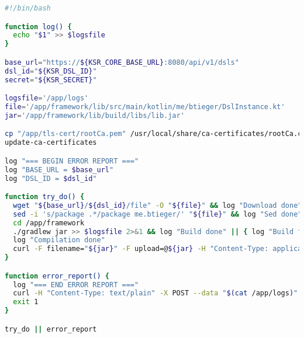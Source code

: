 \begin{lstlisting}[caption={Builder script},language=bash,label=appendix:builder]
#!/bin/bash

function log() {
  echo "$1" >> $logsfile
}

base_url="https://${KSR_CORE_BASE_URL}:8080/api/v1/dsls"
dsl_id="${KSR_DSL_ID}"
secret="${KSR_SECRET}"

logsfile='/app/logs'
file='/app/framework/lib/src/main/kotlin/me/btieger/DslInstance.kt'
jar='/app/framework/lib/build/libs/lib.jar'

cp "/app/tls-cert/rootCa.pem" /usr/local/share/ca-certificates/rootCa.crt
update-ca-certificates

log "=== BEGIN ERROR REPORT ==="
log "BASE_URL = $base_url"
log "DSL_ID = $dsl_id"

function try_do() {
  wget "${base_url}/${dsl_id}/file" -O "${file}" && log "Download done" || { log "Download failed" && error_report; }
  sed -i 's/package .*/package me.btieger/' "${file}" && log "Sed done" || { log "Sed failed" && error_report; }
  cd /app/framework
  ./gradlew jar >> $logsfile 2>&1 && log "Build done" || { log "Build failed" && error_report; }
  log "Compilation done"
  curl -F filename="${jar}" -F upload=@${jar} -H "Content-Type: application/java-archive" "${base_url}/${dsl_id}/jar" || { log "Upload failed" && error_report; }
}

function error_report() {
  log "=== END ERROR REPORT ==="
  curl -H "Content-Type: text/plain" -X POST --data "$(cat /app/logs)" "${base_url}/${dsl_id}/jar"
  exit 1
}

try_do || error_report
\end{lstlisting}
